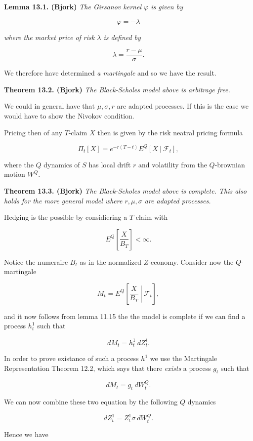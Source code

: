 \documentclass[
]{book}
\begin{document}
\textbf{Lemma 13.1. (Bjork)} \emph{The Girsanov kernel \(\varphi\) is given by}

\[
\varphi = -\lambda
\]

\emph{where the market price of risk \(\lambda\) is defined by}

\[
\lambda =\frac{r-\mu}{\sigma}.
\]

We therefore have determined \emph{a martingale} and so we have the result.

\textbf{Theorem 13.2. (Bjork)} \emph{The Black-Scholes model above is arbitrage free.}

We could in general have that \(\mu,\sigma,r\) are adapted processes. If this is the case we would have to show the Nivokov condition.

Pricing then of any \(T\)-claim \(X\) then is given by the risk neatral pricing formula

\[
\Pi_t[X]=e^{-r(T-t)}E^Q[X\ \vert\ \mathcal{F}_t],\tag{13.7}
\]

where the \(Q\) dynamics of \(S\) has local drift \(r\) and volatility from the \(Q\)-brownian motion \(W^Q\).

\textbf{Theorem 13.3. (Bjork)} \emph{The Black-Scholes model above is complete. This also holds for the more general model where \(r,\mu,\sigma\) are adapted processes.}

Hedging is the possible by considiering a \(T\) claim with

\[
E^Q\left[\frac{X}{B_T}\right]<\infty.
\]

Notice the numeraire \(B_t\) as in the normalized \(Z\)-economy. Consider now the \(Q\)-martingale

\[
M_t=E^Q\left[\left. \frac{X}{B_T}\ \right\vert\ \mathcal{F}_t\right],\tag{13.9}
\]

and it now follows from lemma 11.15 the the model is complete if we can find a process \(h_t^1\) such that

\[
dM_t=h_t^1\ dZ_t^i.\tag{13.10}
\]

In order to prove existance of such a process \(h^1\) we use the Martingale Representation Theorem 12.2, which says that there \emph{exists} a process \(g_t\) such that

\[
dM_t=g_t\ dW_t^Q.\tag{13.11}
\]

We can now combine these two equation by the following \(Q\) dynamics

\[
dZ_t^1=Z_t^1\sigma\ dW_t^Q.\tag{13.12}
\]

Hence we have
\end{document}
